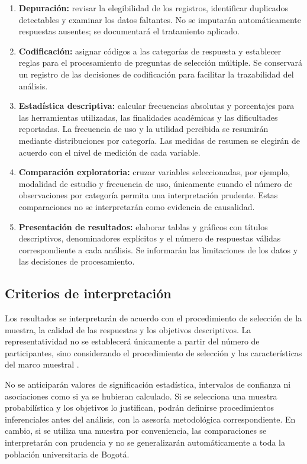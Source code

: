 \begin{enumerate}
    \item \textbf{Depuración:} revisar la elegibilidad de los registros, identificar duplicados detectables y examinar los datos faltantes. No se imputarán automáticamente respuestas ausentes; se documentará el tratamiento aplicado.

    \item \textbf{Codificación:} asignar códigos a las categorías de respuesta y establecer reglas para el procesamiento de preguntas de selección múltiple. Se conservará un registro de las decisiones de codificación para facilitar la trazabilidad del análisis.

    \item \textbf{Estadística descriptiva:} calcular frecuencias absolutas y porcentajes para las herramientas utilizadas, las finalidades académicas y las dificultades reportadas. La frecuencia de uso y la utilidad percibida se resumirán mediante distribuciones por categoría. Las medidas de resumen se elegirán de acuerdo con el nivel de medición de cada variable.

    \item \textbf{Comparación exploratoria:} cruzar variables seleccionadas, por ejemplo, modalidad de estudio y frecuencia de uso, únicamente cuando el número de observaciones por categoría permita una interpretación prudente. Estas comparaciones no se interpretarán como evidencia de causalidad.

    \item \textbf{Presentación de resultados:} elaborar tablas y gráficos con títulos descriptivos, denominadores explícitos y el número de respuestas válidas correspondiente a cada análisis. Se informarán las limitaciones de los datos y las decisiones de procesamiento.
\end{enumerate}

\subsection{Criterios de interpretación}

Los resultados se interpretarán de acuerdo con el procedimiento de selección de la muestra, la calidad de las respuestas y los objetivos descriptivos. La representatividad no se establecerá únicamente a partir del número de participantes, sino considerando el procedimiento de selección y las características del marco muestral \parencite{argibay2009muestra}.

No se anticiparán valores de significación estadística, intervalos de confianza ni asociaciones como si ya se hubieran calculado. Si se selecciona una muestra probabilística y los objetivos lo justifican, podrán definirse procedimientos inferenciales antes del análisis, con la asesoría metodológica correspondiente. En cambio, si se utiliza una muestra por conveniencia, las comparaciones se interpretarán con prudencia y no se generalizarán automáticamente a toda la población universitaria de Bogotá.


